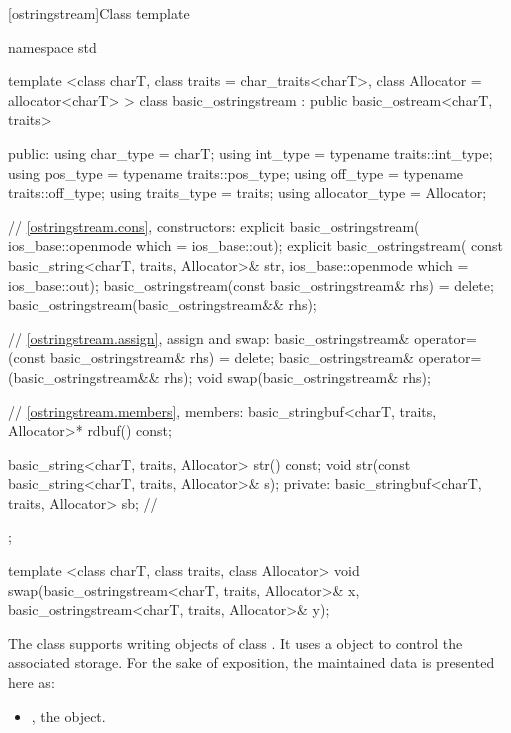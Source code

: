 [ostringstream]{Class template }

%
\begin{codeblock}
namespace std {
  template <class charT, class traits = char_traits<charT>,
            class Allocator = allocator<charT> >
  class basic_ostringstream
    : public basic_ostream<charT, traits> {
  public:
    using char_type      = charT;
    using int_type       = typename traits::int_type;
    using pos_type       = typename traits::pos_type;
    using off_type       = typename traits::off_type;
    using traits_type    = traits;
    using allocator_type = Allocator;

    // \ref{ostringstream.cons}, constructors:
    explicit basic_ostringstream(
      ios_base::openmode which = ios_base::out);
    explicit basic_ostringstream(
      const basic_string<charT, traits, Allocator>& str,
      ios_base::openmode which = ios_base::out);
    basic_ostringstream(const basic_ostringstream& rhs) = delete;
    basic_ostringstream(basic_ostringstream&& rhs);

    // \ref{ostringstream.assign}, assign and swap:
    basic_ostringstream& operator=(const basic_ostringstream& rhs) = delete;
    basic_ostringstream& operator=(basic_ostringstream&& rhs);
    void swap(basic_ostringstream& rhs);

    // \ref{ostringstream.members}, members:
    basic_stringbuf<charT, traits, Allocator>* rdbuf() const;

    basic_string<charT, traits, Allocator> str() const;
    void str(const basic_string<charT, traits, Allocator>& s);
   private:
    basic_stringbuf<charT, traits, Allocator> sb; // \expos
  };

  template <class charT, class traits, class Allocator>
    void swap(basic_ostringstream<charT, traits, Allocator>& x,
              basic_ostringstream<charT, traits, Allocator>& y);
}
\end{codeblock}

\pnum
The class
supports writing objects of class
.
It uses a
object to control the associated storage.
For the sake of exposition, the maintained data is presented here as:
\begin{itemize}
\item
{}, the  object.
\end{itemize}

